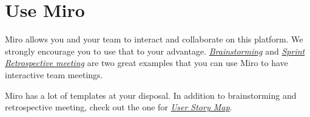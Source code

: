 \documentclass[letterpaper,10pt,english]{jupyterBook}
\begin{document}
\section{Use Miro}
\label{\detokenize{appendices/appendix_d/miro_guide:use-miro}}
\sphinxAtStartPar
Miro allows you and your team to interact and collaborate on this platform. We strongly encourage you to use that to
your advantage. {\hyperref[\detokenize{appendices/appendix_d/miro_guide:miro-for-brainstorming}]{\emph{Brainstorming}}} and
{\hyperref[\detokenize{appendices/appendix_d/miro_guide:miro-for-sprint-retrospective}]{\emph{Sprint Retrospective meeting}}} are two great examples that you can use Miro to have
interactive team meetings.

\sphinxAtStartPar
Miro has a lot of templates at your disposal.  In addition to brainstorming and retrospective meeting, check out the
one for {\hyperref[\detokenize{appendices/appendix_d/miro_guide:miro-for-user-story-map}]{\emph{User Story Map}}}.
\end{document}
